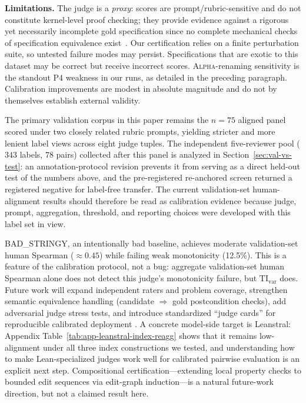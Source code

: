 \documentclass{article}
\begin{document}
\textbf{Limitations.} The judge is a \emph{proxy}: scores are prompt/rubric-sensitive and do not constitute kernel-level proof checking; they provide evidence against a rigorous yet necessarily incomplete gold specification since no complete mechanical checks of specification equivalence exist~\citep{rice1953}.
Our certification relies on a finite perturbation suite, so untested failure modes may persist. Specifications that are exotic to this dataset may be correct but receive incorrect scores.
\textsc{Alpha}-renaming sensitivity is the standout P4 weakness in our runs, as detailed in the preceding paragraph.
Calibration improvements are modest in absolute magnitude and do not by themselves establish external validity.

The primary validation corpus in this paper remains the \(n=75\) aligned panel scored under two closely related rubric prompts, yielding stricter and more lenient label views across eight judge tuples. The independent five-reviewer pool (\(343\) labels, \(78\) pairs) collected after this panel is analyzed in Section~\ref{sec:val-vs-test}: an annotation-protocol revision prevents it from serving as a direct held-out test of the numbers above, and the pre-registered re-anchored screen returned a registered negative for label-free transfer.
The current validation-set human-alignment results should therefore be read as calibration evidence because judge, prompt, aggregation, threshold, and reporting choices were developed with this label set in view.

BAD\_STRINGY, an intentionally bad baseline, achieves moderate validation-set human Spearman (\(\approx0.45\)) while failing weak monotonicity (12.5\%).
This is a feature of the calibration protocol, not a bug: aggregate validation-set human Spearman alone does not detect this judge's monotonicity failure, but \(\mathrm{TI}_{\mathrm{var}}\) does.
Future work will expand independent raters and problem coverage, strengthen semantic equivalence handling (candidate $\Rightarrow$ gold postcondition checks), add adversarial judge stress tests, and introduce standardized ``judge cards'' for reproducible calibrated deployment \citep{zhou2025graders}. A concrete model-side target is Leanstral: Appendix Table~\ref{tab:app-leanstral-index-reagg} shows that it remains low-alignment under all three index constructions we tested, and understanding how to make Lean-specialized judges work well for calibrated pairwise evaluation is an explicit next step.
Compositional certification---extending local property checks to bounded edit sequences via edit-graph induction---is a natural future-work direction, but not a claimed result here.
\end{document}
